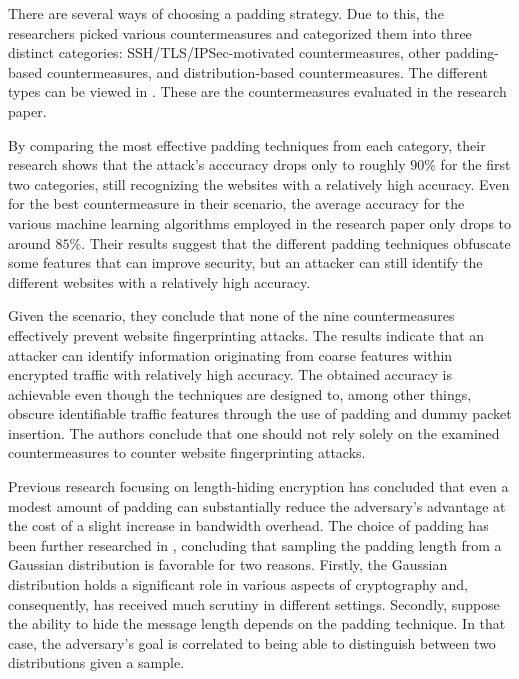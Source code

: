 There are several ways of choosing a padding strategy. Due to this, the researchers \cite{DBLP:conf/sp/DyerCRS12} picked various countermeasures and categorized them into three distinct categories: SSH/TLS/IPSec-motivated countermeasures, other padding-based countermeasures, and distribution-based countermeasures. The different types can be viewed in . These are the countermeasures evaluated in the research paper.

By comparing the most effective padding techniques from each category, their research shows that the attack's acccuracy drops only to roughly $90\%$ for the first two categories, still recognizing the websites with a relatively high accuracy. Even for the best countermeasure in their scenario, the average accuracy for the various machine learning algorithms employed in the research paper only drops to around $85\%$. Their results suggest that the different padding techniques obfuscate some features that can improve security, but an attacker can still identify the different websites with a relatively high accuracy. 

Given the scenario, they conclude that none of the nine countermeasures effectively prevent website fingerprinting attacks. The results indicate that an attacker can identify information originating from coarse features within encrypted traffic with relatively high accuracy. The obtained accuracy is achievable even though the techniques are designed to, among other things, obscure identifiable traffic features through the use of padding and dummy packet insertion. The authors conclude that one should not rely solely on the examined countermeasures to counter website fingerprinting attacks.

Previous research \cite{DBLP:conf/ctrsa/GellertJLN22} focusing on length-hiding encryption has concluded that even a modest amount of padding can substantially reduce the adversary's advantage at the cost of a slight increase in bandwidth overhead. The choice of padding has been further researched in \cite{DBLP:conf/ccs/Degabriele21}, concluding that sampling the padding length from a Gaussian distribution is favorable for two reasons. Firstly, the Gaussian distribution holds a significant role in various aspects of cryptography and, consequently, has received much scrutiny in different settings. Secondly, suppose the ability to hide the message length depends on the padding technique. In that case, the adversary's goal is correlated to being able to distinguish between two distributions given a sample.

